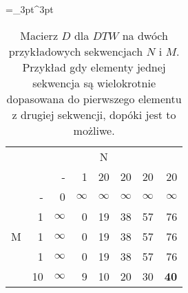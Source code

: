 \begin{table}[H]
    \caption{Macierz $D$ dla $DTW$ na dwóch przykładowych sekwencjach $N$ i $M$. Przykład gdy elementy jednej sekwencja są wielokrotnie dopasowana do pierwszego elementu z drugiej sekwencji, dopóki jest to możliwe.}
    \centering
    \label{tab:dtw_example0}
    \small
    \tabulinesep =_3pt^3pt
    \begin{tabu}{r*{7}{r}}
         & & 
        \\
        & & - & 1 & 20 & 20 & 20 & 20
        \\ \midrule
         & - & 0 & $\infty$ & $\infty$ & $\infty$ & $\infty$ & $\infty$
        \\
        & 1 & $\infty$ & 0 & 19 & 38 & 57 & 76
        \\
        & 1 & $\infty$ & 0 & 19 & 38 & 57 & 76
        \\
        & 1 & $\infty$ & 0 & 19 & 38 & 57 & 76
        \\
        & 10 & $\infty$ & 9 & 10 & 20 & 30 & \textbf{40}
        \\
    \end{tabu}
\end{table}


